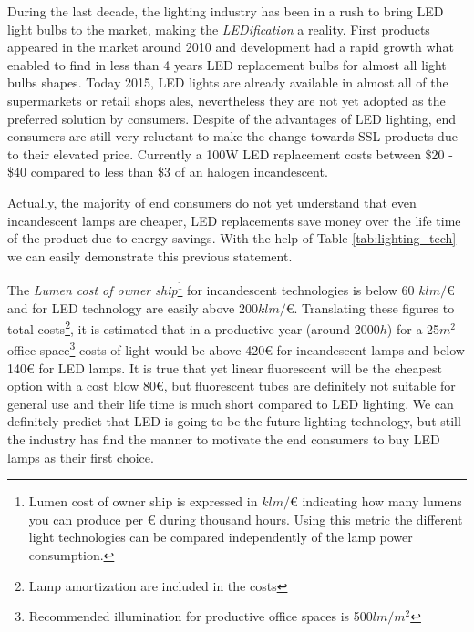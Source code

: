 During the last decade, the lighting industry has been in a rush to bring LED light bulbs to the market, making the \emph{LEDification} a reality. First products appeared in the market around 2010 and development had a rapid growth what enabled to find in less than 4 years LED replacement bulbs for almost all light bulbs shapes. Today 2015, LED lights are already available in almost all of the supermarkets or retail shops ales, nevertheless they are not yet adopted as the preferred solution by consumers. Despite of the advantages of LED lighting, end consumers are still very reluctant to make the change towards SSL products due to their elevated price. Currently a 100W LED replacement costs between \$20 - \$40 compared to less than \$3 of an halogen incandescent.

Actually, the majority of end consumers do not yet understand that even incandescent lamps are cheaper, LED replacements save money over the life time of the product due to energy savings. With the help of Table \ref{tab:lighting_tech} we can easily demonstrate this previous statement.

The \emph{Lumen cost of owner ship}\footnote{Lumen cost of owner ship is expressed in $klm/$€ indicating how many lumens you can produce per € during thousand hours. Using this metric the different light technologies can be compared independently of the lamp power consumption.} for incandescent technologies is below 60 $klm/$€ and for LED technology are easily above 200$klm/$€. Translating these figures to total costs\footnote{Lamp amortization are included in the costs}, it is estimated that in a productive year (around 2000$h$) for a 25$ m^2 $  office space\footnote{Recommended illumination for productive office spaces is 500$ lm/m^2 $ } costs of light would be above 420€ for incandescent lamps and below 140€ for LED lamps. It is true that yet linear fluorescent will be the cheapest option with a cost blow 80€, but fluorescent tubes are definitely not suitable for general use and their life time is much short compared to LED lighting. We can definitely predict that LED is going to be the future lighting technology, but still the industry has find the manner to motivate the end consumers to buy LED lamps as their first choice.


